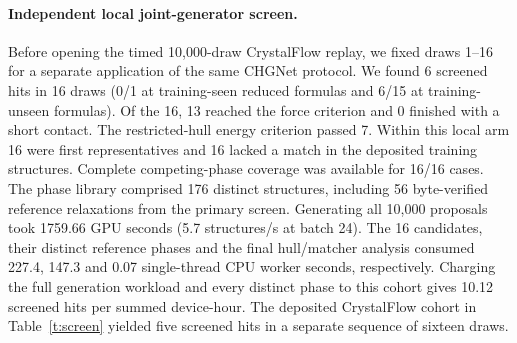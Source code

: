 \paragraph{Independent local joint-generator screen.}
Before opening the timed 10,000-draw CrystalFlow replay, we fixed draws 1--16 for a separate application of the same CHGNet protocol. We found 6 screened hits in 16 draws (0/1 at training-seen reduced formulas and 6/15 at training-unseen formulas). Of the 16, 13 reached the force criterion and 0 finished with a short contact. The restricted-hull energy criterion passed 7. Within this local arm 16 were first representatives and 16 lacked a match in the deposited training structures. Complete competing-phase coverage was available for 16/16 cases. The phase library comprised 176 distinct structures, including 56 byte-verified reference relaxations from the primary screen.
Generating all 10,000 proposals took 1759.66 GPU seconds (5.7 structures/s at batch 24). The 16 candidates, their distinct reference phases and the final hull/matcher analysis consumed 227.4, 147.3 and 0.07 single-thread CPU worker seconds, respectively. Charging the full generation workload and every distinct phase to this cohort gives 10.12 screened hits per summed device-hour. The deposited CrystalFlow cohort in Table~\ref{t:screen} yielded five screened hits in a separate sequence of sixteen draws.
